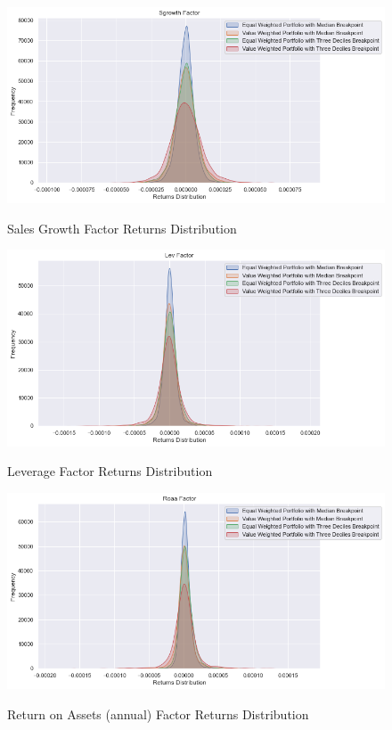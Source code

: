 \begin{figure}[H]
	\caption{Sales Growth Factor Returns Distribution}
	\centering
	\includegraphics[scale=.63]{../../output/figures/sgrowth.png}
	\label{fig:sgrowth}
\end{figure}

\begin{figure}[H]
	\caption{Leverage Factor Returns Distribution}
	\centering
	\includegraphics[scale=.63]{../../output/figures/lev.png}
	\label{fig:lev}
\end{figure}

\begin{figure}[H]
	\caption{Return on Assets (annual) Factor Returns Distribution}
	\centering
	\includegraphics[scale=.63]{../../output/figures/roaa.png}
	\label{fig:roaa}
\end{figure}

